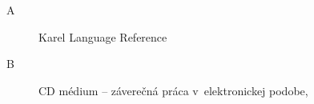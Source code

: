 
\chapter*{\appendixlistname}

\begin{description}
	\item[\appendixname{} A] Karel Language Reference
    \item[\appendixname{} B] CD médium -- záverečná práca v~elektronickej podobe,
\end{description}
